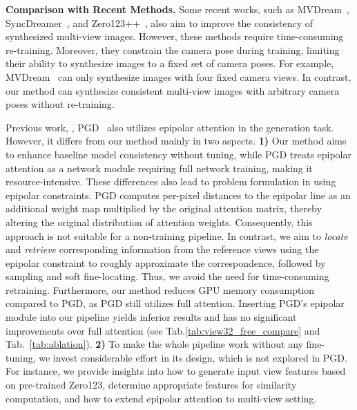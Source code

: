\noindent\textbf{Comparison with Recent Methods.}
Some recent works, such as MVDream~\cite{mvdream}, SyncDreamer~\cite{SyncDreamer}, and Zero123++~\cite{zero123++}, also aim to improve the consistency of synthesized multi-view images. However, these methods require time-consuming re-training. Moreover, they constrain the camera pose during training, limiting their ability to synthesize images to a fixed set of camera poses. For example, MVDream~\cite{mvdream} can only synthesize images with four fixed camera views. In contrast, our method can synthesize consistent multi-view images with arbitrary camera poses without re-training.

Previous work, \ie, PGD~\cite{tseng2023consistent} also utilizes epipolar attention in the generation task. However, it differs from our method mainly in two aspects.
\textbf{1)} Our method aims to enhance baseline model consistency without tuning, while PGD treats epipolar attention as a network module requiring full network training, making it resource-intensive. 
These differences also lead to problem formulation in using epipolar constraints.
PGD computes per-pixel distances to the epipolar line as an additional weight map multiplied by the original attention matrix, thereby altering the original distribution of attention weights. 
Consequently, this approach is not suitable for a non-training pipeline. 
In contrast, we aim to \textit{locate} and \textit{retrieve} corresponding information from the reference views using the epipolar constraint to roughly approximate the correspondence, followed by sampling and soft fine-locating.
Thus, we avoid the need for time-consuming retraining. 
Furthermore, our method reduces GPU memory consumption compared to PGD, as PGD still utilizes full attention.
Inserting PGD's epipolar module into our pipeline yields inferior results and has no significant improvements over full attention (see Tab.\ref{tab:view32_free_compare} and Tab.~\ref{tab:ablation}).
\textbf{2)} To make the whole pipeline work without any fine-tuning, we invest considerable effort in its design, which is not explored in PGD. For instance, we provide insights into how to generate input view features based on pre-trained Zero123, determine appropriate features for similarity computation, and how to extend epipolar attention to multi-view setting.

